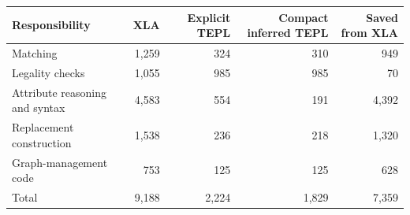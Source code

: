 \begin{tabular}{lrrrr}
\toprule
Responsibility & XLA & Explicit TEPL & Compact inferred TEPL & Saved from XLA \\
\midrule
Matching & 1,259 & 324 & 310 & 949 \\
Legality checks & 1,055 & 985 & 985 & 70 \\
Attribute reasoning and syntax & 4,583 & 554 & 191 & 4,392 \\
Replacement construction & 1,538 & 236 & 218 & 1,320 \\
Graph-management code & 753 & 125 & 125 & 628 \\
Total & 9,188 & 2,224 & 1,829 & 7,359 \\
\bottomrule
\end{tabular}
